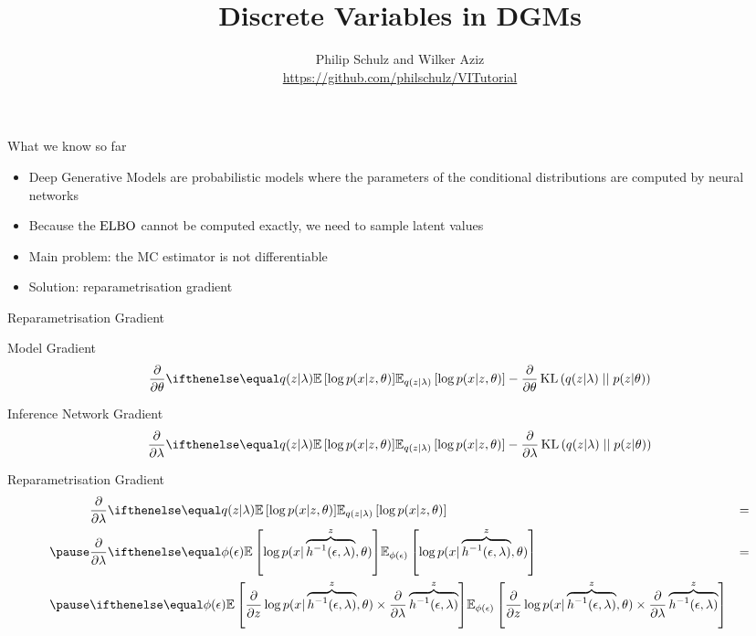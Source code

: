 \documentclass[14pt]{beamer}
\title{Discrete Variables in DGMs}
\author{Philip Schulz and Wilker Aziz\\
\url{https://github.com/philschulz/VITutorial}}
\date{}
\begin{document}
\begin{frame}
\maketitle
\end{frame}

\begin{frame}{What we know so far}
\begin{itemize}
\item Deep Generative Models are probabilistic models where the parameters of the conditional
distributions are computed by neural networks
\pause
\item Because the $ \operatorname{ELBO} $ cannot be computed exactly, we need to sample latent values
\pause
\item Main problem: the MC estimator is not differentiable
\pause
\item Solution: reparametrisation gradient
\end{itemize}
\end{frame}

\begin{frame}{Reparametrisation Gradient}
\begin{block}{Model Gradient}
\begin{equation*}
\frac{\partial}{\partial \theta}\E[q(z|\lambda)]{\log p(x|z,\theta)} - \frac{\partial}{\partial \theta}\KL{q(z|\lambda)}{p(z|\theta)}
\end{equation*}
\end{block}
\pause
\begin{block}{Inference Network Gradient}
\begin{equation*}
\frac{\partial}{\partial \lambda}\E[q(z|\lambda)]{\log p(x|z,\theta)} - \frac{\partial}{\partial \lambda}\KL{q(z|\lambda)}{p(z|\theta)}
\end{equation*}
\end{block}
\end{frame}

\begin{frame}{Reparametrisation Gradient}
\begin{equation*}
\begin{aligned}
&\frac{\partial}{\partial \lambda}\E[q(z|\lambda)]{\log p(x|z,\theta)} &= \\
\pause
&\frac{\partial}{\partial \lambda}\E[\phi(\epsilon)]{\log p(x|\overbrace{h^{-1}(\epsilon, \lambda)}^{z},\theta)} &= \\
\pause
&\E[\phi(\epsilon)]{\frac{\partial}{\partial z}\log p(x|\overbrace{h^{-1}(\epsilon, \lambda)}^{z},\theta) \times \frac{\partial}{\partial \lambda}
\overbrace{h^{-1}(\epsilon, \lambda)}^{z}} &
\end{aligned}
\end{equation*}
\end{frame}
\end{document}
